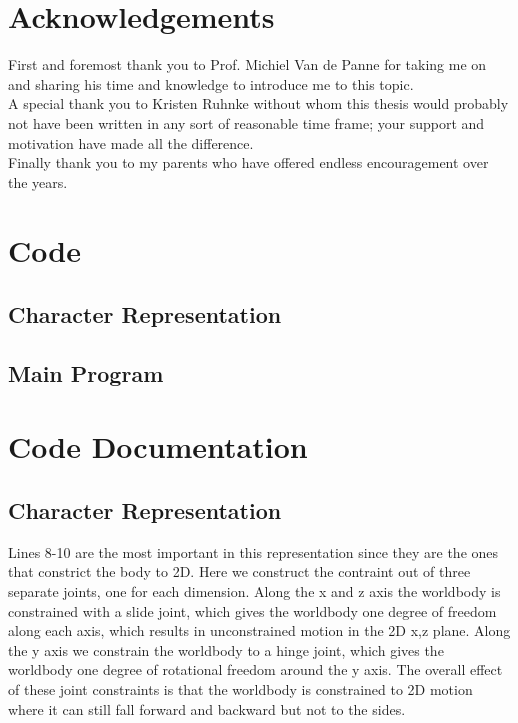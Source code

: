 \documentclass[12pt, a4paper]{article}
\begin{document}
\section{Acknowledgements}
First and foremost thank you to Prof. Michiel Van de Panne for taking me on and sharing his time and knowledge to introduce me to this topic.\\

A special thank you to Kristen Ruhnke without whom this thesis would probably not have been written in any sort of reasonable time frame; your support and motivation have made all the difference.\\

Finally thank you to my parents who have offered endless encouragement over the years.


\appendix
\section{Code}
\label{apdx: code}
\subsection{Character Representation}
\lstset{breaklines=true,breakatwhitespace = false, basicstyle=\footnotesize, numbers=left}

\subsection{Main Program}



\section{Code Documentation}
\label{apdx: code doc}
\subsection{Character Representation}

Lines 8-10 are the most important in this representation since they are the ones that constrict the body to 2D. Here we construct the contraint out of three separate joints, one for each dimension. Along the x and z axis the worldbody is constrained with a slide joint, which gives the worldbody one degree of freedom along each axis, which results in unconstrained motion in the 2D x,z plane. Along the y axis we constrain the worldbody to a hinge joint, which gives the worldbody one degree of rotational freedom around the y axis. The overall effect of these joint constraints is that the worldbody is constrained to 2D motion where it can still fall forward and backward but not to the sides. \\
\end{document}
